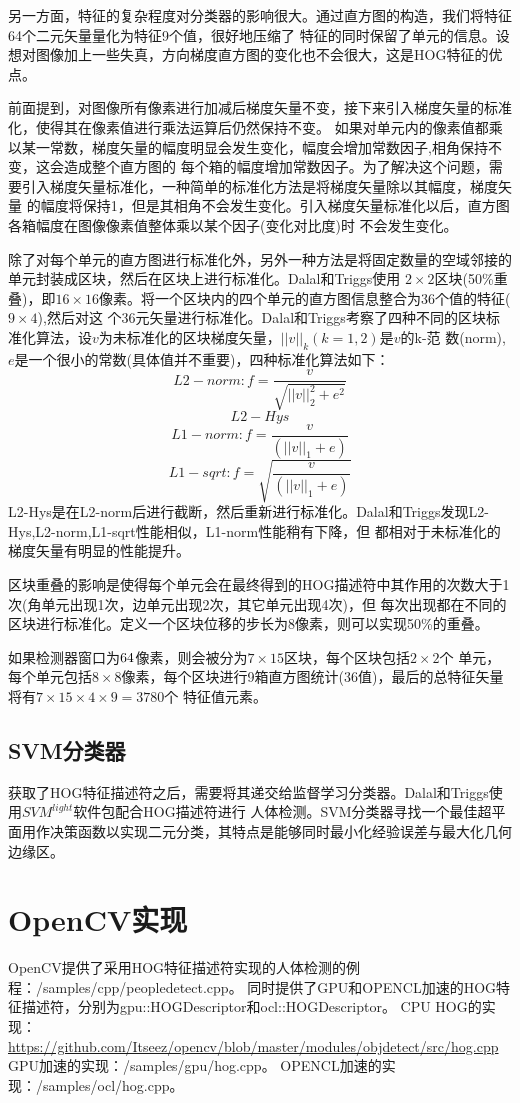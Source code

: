 \documentclass[10pt,technote,onecolumn,twoside]{IEEEtran}
\begin{document}
另一方面，特征的复杂程度对分类器的影响很大。通过直方图的构造，我们将特征{64个二元矢量}量化为特征{9个值}，很好地压缩了
特征的同时保留了单元的信息。设想对图像加上一些失真，方向梯度直方图的变化也不会很大，这是HOG特征的优点。

前面提到，对图像所有像素进行加减后梯度矢量不变，接下来引入梯度矢量的标准化，使得其在像素值进行乘法运算后仍然保持不变。
如果对单元内的像素值都乘以某一常数，梯度矢量的幅度明显会发生变化，幅度会增加常数因子,相角保持不变，这会造成整个直方图的
每个箱的幅度增加常数因子。为了解决这个问题，需要引入梯度矢量标准化，一种简单的标准化方法是将梯度矢量除以其幅度，梯度矢量
的幅度将保持1，但是其相角不会发生变化。引入梯度矢量标准化以后，直方图各箱幅度在图像像素值整体乘以某个因子(变化对比度)时
不会发生变化。

除了对每个单元的直方图进行标准化外，另外一种方法是将固定数量的空域邻接的单元封装成区块，然后在区块上进行标准化。Dalal和Triggs使用
$2\times2$区块(50\%重叠)，即$16\times16$像素。将一个区块内的四个单元的直方图信息整合为36个值的特征($9\times4$),然后对这
个36元矢量进行标准化。Dalal和Triggs考察了四种不同的区块标准化算法，设$v$为未标准化的区块梯度矢量，$||v||_k(k=1,2)$是$v$的k-范
数(norm),$e$是一个很小的常数(具体值并不重要)，四种标准化算法如下：
\[L2-norm:f=\frac{v}{\sqrt{||v||^2_2+e^2}}\]
\[L2-Hys\]
\[L1-norm:f=\frac{v}{(||v||_1+e)}\]
\[L1-sqrt:f=\sqrt{\frac{v}{(||v||_1+e)}}\]
L2-Hys是在L2-norm后进行截断，然后重新进行标准化。Dalal和Triggs发现L2-Hys,L2-norm,L1-sqrt性能相似，L1-norm性能稍有下降，但
都相对于未标准化的梯度矢量有明显的性能提升。

区块重叠的影响是使得每个单元会在最终得到的HOG描述符中其作用的次数大于1次(角单元出现1次，边单元出现2次，其它单元出现4次)，但
每次出现都在不同的区块进行标准化。定义一个区块位移的步长为8像素，则可以实现50\%的重叠。

如果检测器窗口为$64\time128$像素，则会被分为$7\times15$区块，每个区块包括$2\times2$个
单元，每个单元包括$8\times8$像素，每个区块进行9箱直方图统计(36值)，最后的总特征矢量将有$7\times15\times4\times9=3780$个
特征值元素。

\subsection{SVM分类器}
获取了HOG特征描述符之后，需要将其递交给监督学习分类器。Dalal和Triggs使用$SVM^{light}$\cite{bib7}软件包配合HOG描述符进行
人体检测。SVM分类器寻找一个最佳超平面用作决策函数以实现二元分类，其特点是能够同时最小化经验误差与最大化几何边缘区。

\section{OpenCV实现}
OpenCV提供了采用HOG特征描述符实现的人体检测的例程：\textsf{/samples/cpp/peopledetect.cpp}。
同时提供了GPU和OPENCL加速的HOG特征描述符，分别为\textsf{gpu::HOGDescriptor}和\textsf{ocl::HOGDescriptor}。
CPU HOG的实现：\url{https://github.com/Itseez/opencv/blob/master/modules/objdetect/src/hog.cpp}
GPU加速的实现：\textsf{/samples/gpu/hog.cpp}。
OPENCL加速的实现：\textsf{/samples/ocl/hog.cpp}。
\end{document}
